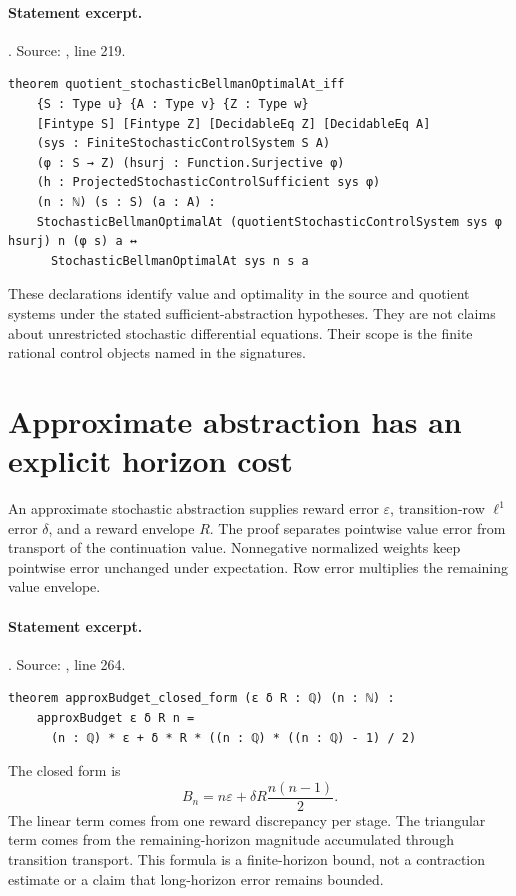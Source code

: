\documentclass[11pt]{article}
\begin{document}
\paragraph{Statement excerpt.}. Source: , line 219.
\begin{lstlisting}[style=AVOCSource]
theorem quotient_stochasticBellmanOptimalAt_iff
    {S : Type u} {A : Type v} {Z : Type w}
    [Fintype S] [Fintype Z] [DecidableEq Z] [DecidableEq A]
    (sys : FiniteStochasticControlSystem S A)
    (φ : S → Z) (hsurj : Function.Surjective φ)
    (h : ProjectedStochasticControlSufficient sys φ)
    (n : ℕ) (s : S) (a : A) :
    StochasticBellmanOptimalAt (quotientStochasticControlSystem sys φ hsurj) n (φ s) a ↔
      StochasticBellmanOptimalAt sys n s a
\end{lstlisting}


These declarations identify value and optimality in the source and quotient
systems under the stated sufficient-abstraction hypotheses. They are not
claims about unrestricted stochastic differential equations. Their scope is
the finite rational control objects named in the signatures.

\section{Approximate abstraction has an explicit horizon cost}
An approximate stochastic abstraction supplies reward error $\varepsilon$,
transition-row $\ell^1$ error $\delta$, and a reward envelope $R$. The proof
separates pointwise value error from transport of the continuation value.
Nonnegative normalized weights keep pointwise error unchanged under
expectation. Row error multiplies the remaining value envelope.

\paragraph{Statement excerpt.}. Source: , line 264.
\begin{lstlisting}[style=AVOCSource]
theorem approxBudget_closed_form (ε δ R : ℚ) (n : ℕ) :
    approxBudget ε δ R n =
      (n : ℚ) * ε + δ * R * ((n : ℚ) * ((n : ℚ) - 1) / 2)
\end{lstlisting}


The closed form is
\[
 B_n=n\varepsilon+\delta R\frac{n(n-1)}2.
\]
The linear term comes from one reward discrepancy per stage. The triangular
term comes from the remaining-horizon magnitude accumulated through transition
transport. This formula is a finite-horizon bound, not a contraction estimate
or a claim that long-horizon error remains bounded.
\end{document}
